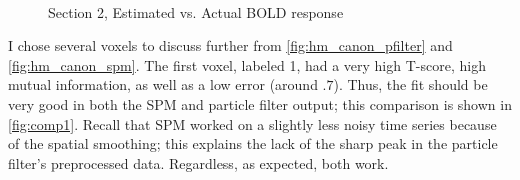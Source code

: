 
\begin{figure}
\\
\caption{Section 2, Estimated vs. Actual BOLD response}
\label{fig:comp2}
\end{figure}

I chose several voxels to discuss further from \autoref{fig:hm_canon_pfilter} and \autoref{fig:hm_canon_spm}.
The first voxel, labeled 1, had a very high T-score, high mutual information,  as well as 
a low error (around $.7$). Thus, the
fit should be very good in both the SPM and particle filter output; this comparison is shown in 
\autoref{fig:comp1}. Recall that SPM worked on a slightly less noisy time series because of the
spatial smoothing; this explains the lack of the sharp peak in the particle filter's preprocessed
data. Regardless, as expected, both work. 

